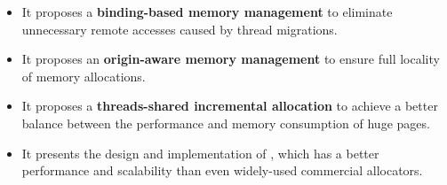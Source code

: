 \begin{itemize}

\item It proposes a \textbf{binding-based memory management} to eliminate unnecessary remote accesses caused by thread migrations.

\item It proposes an \textbf{origin-aware memory management} to ensure full locality of memory allocations. 

\item It proposes a \textbf{threads-shared incremental allocation} to achieve a better balance between the performance and memory consumption of huge pages. 

\item It presents the design and implementation of \NM{}, which has a better performance and scalability than even widely-used commercial allocators.

\end{itemize}

